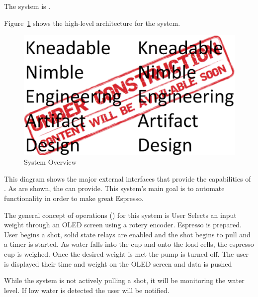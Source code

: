 The \ThisSystem system is \TBD.

Figure~\ref{fig:SystemOverview} shows the high-level architecture for the \ThisSys system. 
\begin{figure}[htbp]
	\centering
		\includegraphics[width=6in]{images/KNEAD_UnderConstruction_100dpi_6.5inchesWide.eps}
		\caption{System Overview}
	\label{fig:SystemOverview}
\end{figure}
This diagram shows the major external interfaces that provide the capabilities of \ThisSys.
As are shown, the \ThisSys can provide. This system's main goal is to automate functionality
in order to make great Espresso.


The general concept of operations (\CONOP) for this system is User Selects an input weight through
an OLED screen using a rotery encoder. Espresso is prepared. User begins a shot, solid state relays 
are enabled and the shot begins to pull and a timer is started. As water falls into the cup and onto 
the load cells, the espresso cup is weighed. Once the desired weight is met the pump is turned off.
The user is displayed their time and weight on the OLED screen and data is pushed \TBD

While the system is not actively pulling a shot, it will be monitoring the water level. If low water
is detected the user will be notified.





